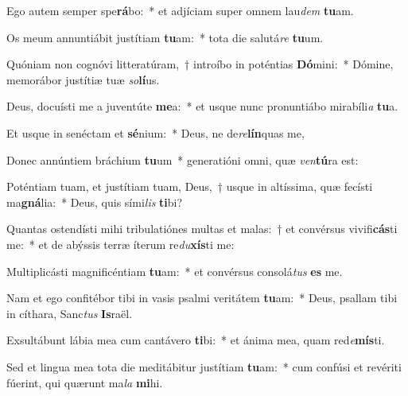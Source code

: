 \item Ego autem semper spe\textbf{rá}bo:~* et adjíciam super omnem lau\textit{dem} \textbf{tu}am.
\item Os meum annuntiábit justítiam \textbf{tu}am:~* tota die salutá\textit{re} \textbf{tu}um.
\item Quóniam non cognóvi litteratúram,~† introíbo in poténtias \textbf{Dó}mini:~* Dómine, memorábor justítiæ tuæ \textit{so}\textbf{lí}us.
\item Deus, docuísti me a juventúte \textbf{me}a:~* et usque nunc pronuntiábo mirabíli\textit{a} \textbf{tu}a.
\item Et usque in senéctam et \textbf{sé}nium:~* Deus, ne de\textit{re}\textbf{lín}quas me,
\item Donec annúntiem bráchium \textbf{tu}um~* generatióni omni, quæ \textit{ven}\textbf{tú}ra est:
\item Poténtiam tuam, et justítiam tuam, Deus,~† usque in altíssima, quæ fecísti ma\textbf{gná}lia:~* Deus, quis sími\textit{lis} \textbf{ti}bi?
\item Quantas ostendísti mihi tribulatiónes multas et malas:~† et convérsus vivifi\textbf{cás}ti me:~* et de abýssis terræ íterum re\textit{du}\textbf{xís}ti me:
\item Multiplicásti magnificéntiam \textbf{tu}am:~* et convérsus consolá\textit{tus} \textbf{es} me.
\item Nam et ego confitébor tibi in vasis psalmi veritátem \textbf{tu}am:~* Deus, psallam tibi in cíthara, Sanc\textit{tus} \textbf{Is}raël.
\item Exsultábunt lábia mea cum cantávero \textbf{ti}bi:~* et ánima mea, quam red\textit{e}\textbf{mís}ti.
\item Sed et lingua mea tota die meditábitur justítiam \textbf{tu}am:~* cum confúsi et revériti fúerint, qui quærunt ma\textit{la} \textbf{mi}hi.
